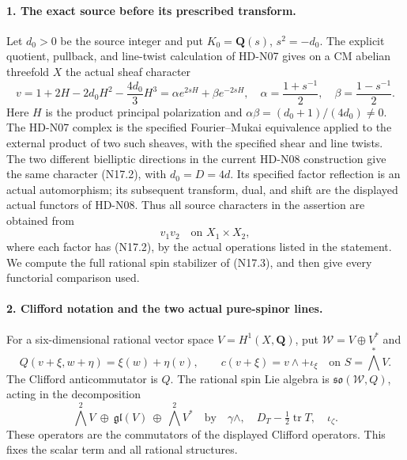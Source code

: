 \paragraph{1. The exact source before its prescribed transform.}
Let $d_0>0$ be the source integer and put
$K_0=\mathbf Q(s)$, $s^2=-d_0$. The explicit quotient, pullback,
and line-twist calculation of HD-N07 gives on a CM abelian
threefold $X$ the actual sheaf character
\begin{equation}
 v=1+2H-2d_0H^2-\frac{4d_0}{3}H^3
    =\alpha e^{2sH}+\beta e^{-2sH},
 \quad\alpha=\frac{1+s^{-1}}2,\quad
 \beta=\frac{1-s^{-1}}2.                              \tag{N17.2}
\end{equation}
Here $H$ is the product principal polarization and
$\alpha\beta=(d_0+1)/(4d_0)\ne0$.
The HD-N07 complex is the specified Fourier--Mukai equivalence
applied to the external product of two such sheaves, with the
specified shear and line twists. The two different bielliptic
directions in the current HD-N08 construction give the same
character (N17.2), with $d_0=D=4d$. Its specified factor reflection
is an actual automorphism; its subsequent transform,
dual, and shift are the displayed actual functors of HD-N08.
Thus all source characters in the assertion are obtained from
\begin{equation}
                 v_1v_2\quad\text{on }X_1\times X_2,  \tag{N17.3}
\end{equation}
where each factor has (N17.2), by the actual operations listed
in the statement. We compute the full rational spin stabilizer
of (N17.3), and then give every functorial comparison used.

\paragraph{2. Clifford notation and the two actual pure-spinor lines.}
For a six-dimensional rational vector space $V=H^1(X,\mathbf Q)$,
put $\mathcal W=V\oplus V^*$ and
\[
 Q(v+\xi,w+\eta)=\xi(w)+\eta(v),\qquad
 c(v+\xi)=v\wedge+\iota_\xi
               \quad\text{on }S=\bigwedge^*V.
\]
The Clifford anticommutator is $Q$. The rational spin Lie algebra
is $\mathfrak{so}(\mathcal W,Q)$, acting in the decomposition
\begin{equation}
 \bigwedge^2V\ \oplus\ \mathfrak{gl}(V)\ \oplus\ \bigwedge^2V^*
 \quad\text{by}\quad
 \gamma\wedge,\quad D_T-\tfrac12\operatorname{tr}T,
                    \quad\iota_\zeta.                \tag{N17.4}
\end{equation}
These operators are the commutators of the displayed Clifford
operators. This fixes the scalar term and all rational structures.

